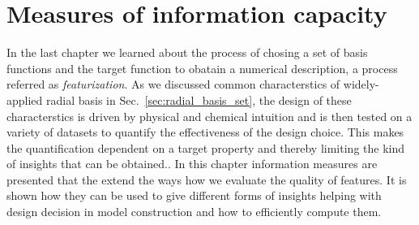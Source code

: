 \chapter{Measures of information capacity}

%

\def\Fone{$\mathcal{F}$}
\def\Ftwo{$\mathcal{G}$}
\def\Ftrue{$\Theta$}

In the last chapter we learned about the process of chosing a set of basis
functions and the target function to obatain a numerical description, a process
referred as \emph{featurization}.  As we discussed common characterstics of
widely-applied radial basis in Sec.~\ref{sec:radial_basis_set}, the design of
these characterstics is driven by physical and chemical intuition and is then
tested on a variety of datasets to quantify the effectiveness of the design
choice\cite{musil2021efficient}.  This makes the quantification dependent on a
target property and thereby limiting the kind of insights that can be obtained..
In this chapter information measures are presented that the extend the ways how we evaluate the quality of features.
It is shown how they can be used to give different forms of insights helping with design decision in model construction and how to efficiently compute them. 

